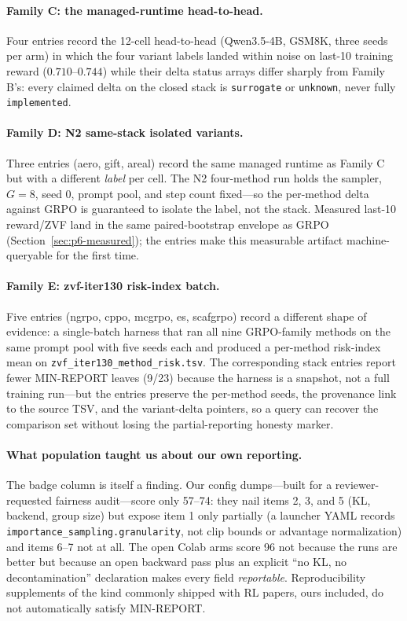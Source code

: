 \documentclass{article}
\begin{document}
\paragraph{Family C: the managed-runtime head-to-head.}
Four entries record the 12-cell head-to-head (Qwen3.5-4B, GSM8K, three seeds
per arm) in which the four variant labels landed within noise on last-10
training reward ($0.710$--$0.744$) while their delta status arrays differ
sharply from Family B's: every claimed delta on the closed stack is
\texttt{surrogate} or \texttt{unknown}, never fully \texttt{implemented}.

\paragraph{Family D: N2 same-stack isolated variants.}
Three entries (aero, gift, areal) record the same managed runtime as Family C
but with a different \emph{label} per cell. The N2 four-method run holds the
sampler, $G{=}8$, seed 0, prompt pool, and step count fixed---so the per-method
delta against GRPO is guaranteed to isolate the label, not the stack. Measured
last-10 reward/ZVF land in the same paired-bootstrap envelope as GRPO
(Section~\ref{sec:p6-measured}); the entries make this measurable artifact
machine-queryable for the first time.

\paragraph{Family E: zvf-iter130 risk-index batch.}
Five entries (ngrpo, cppo, mcgrpo, es, scafgrpo) record a different shape of
evidence: a single-batch harness that ran all nine GRPO-family methods on the
same prompt pool with five seeds each and produced a per-method risk-index
mean on \texttt{zvf\_iter130\_method\_risk.tsv}. The corresponding stack entries
report fewer MIN-REPORT leaves (9/23) because the harness is a snapshot, not a
full training run---but the entries preserve the per-method seeds, the
provenance link to the source TSV, and the variant-delta pointers, so a query
can recover the comparison set without losing the partial-reporting honesty
marker.

\paragraph{What population taught us about our own reporting.}
The badge column is itself a finding. Our config dumps---built for a
reviewer-requested fairness audit---score only 57--74: they nail items 2, 3,
and 5 (KL, backend, group size) but expose item 1 only partially (a launcher
YAML records \texttt{importance_sampling.granularity}, not clip bounds or
advantage normalization) and items 6--7 not at all. The open Colab arms score
96 not because the runs are better but because an open backward pass plus an
explicit ``no KL, no decontamination'' declaration makes every field
\emph{reportable}. Reproducibility supplements of the kind commonly shipped
with RL papers, ours included, do not automatically satisfy MIN-REPORT.
\end{document}
